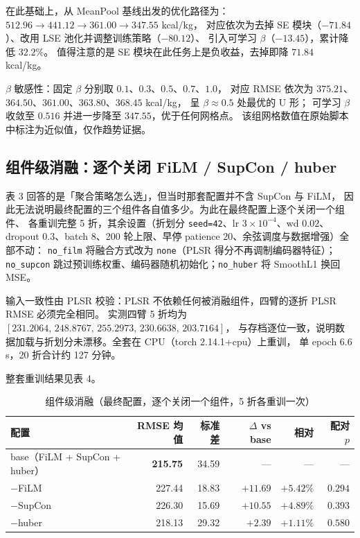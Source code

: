 \documentclass[11pt,a4paper,UTF8]{ctexart}
\begin{document}
在此基础上，从 MeanPool 基线出发的优化路径为：
$512.96 \to 441.12 \to 361.00 \to 347.55$ kcal/kg，
对应依次为去掉 SE 模块（$-71.84$）、改用 LSE 池化并调整训练策略（$-80.12$）、
引入可学习 $\beta$（$-13.45$），累计降低 $32.2\%$。
值得注意的是 SE 模块在此任务上是负收益，去掉即降 $71.84$ kcal/kg。

$\beta$ 敏感性：固定 $\beta$ 分别取 $0.1$、$0.3$、$0.5$、$0.7$、$1.0$，
对应 RMSE 依次为 $375.21$、$364.50$、$361.00$、$363.80$、$368.45$ kcal/kg，
呈 $\beta \approx 0.5$ 处最优的 U 形；
可学习 $\beta$ 收敛至 $0.516$ 并进一步降至 $347.55$，优于任何网格点。
该组网格数值在原始脚本中标注为近似值，仅作趋势证据。

\subsection{组件级消融：逐个关闭 FiLM / SupCon / huber}
\label{sec:component-ablation}
表 3 回答的是「聚合策略怎么选」，但当时那套配置并不含 SupCon 与 FiLM，
因此无法说明最终配置的三个组件各自值多少。为此在最终配置上逐个关闭一个组件、
各重训完整 5 折，其余设置（折划分 \texttt{seed=42}、lr $3\times10^{-4}$、wd $0.02$、
dropout $0.3$、batch 8、200 轮上限、早停 patience 20、余弦调度与数据增强）全部不动：
\texttt{no\_film} 将融合方式改为 \texttt{none}（PLSR 得分不再调制编码器特征）；
\texttt{no\_supcon} 跳过预训练权重、编码器随机初始化；\texttt{no\_huber} 将 SmoothL1 换回 MSE。

输入一致性由 PLSR 校验：PLSR 不依赖任何被消融组件，四臂的逐折 PLSR RMSE 必须完全相同。
实测四臂 5 折均为 $[231.2064,\,248.8767,\,255.2973,\,230.6638,\,203.7164]$，
与存档逐位一致，说明数据加载与折划分未漂移。全套在 CPU（torch 2.14.1+cpu）上重训，
单 epoch $6.6$ s，20 折合计约 127 分钟。

整套重训结果见表 4。

\begin{table}[htbp]
\centering\caption{组件级消融（最终配置，逐个关闭一个组件，5 折各重训一次）}
\label{tab:component-ablation}
\begin{tabular}{lrrrrr}
\toprule
配置 & RMSE 均值 & 标准差 & $\Delta$ vs base & 相对 & 配对 $p$ \\
\midrule
base（FiLM + SupCon + huber） & \textbf{215.75} & 34.59 & --- & --- & --- \\
$-$FiLM   & 227.44 & 18.83 & $+11.69$ & $+5.42\%$ & $0.294$ \\
$-$SupCon & 226.30 & 15.69 & $+10.55$ & $+4.89\%$ & $0.393$ \\
$-$huber  & 218.13 & 29.32 & $+2.39$  & $+1.11\%$ & $0.580$ \\
\bottomrule
\end{tabular}
\end{table}
\end{document}
